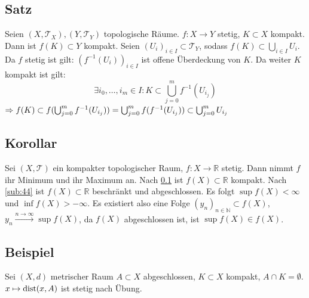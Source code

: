 \subsection[Satz: Das Bild einer kompakten Teilmenge ist kompakt]{Satz} %
\label{sub:49}
Seien $(X,\mathcal{T}_X), (Y, \mathcal{T}_Y)$ topologische Räume. $f : X \to Y$ stetig, $K \subset X$ kompakt. Dann ist $f(K) \subset Y$ kompakt.
Seien $(U_i)_{i \in I} \subset \mathcal{T}_Y$, sodass $f(K) \subset \bigcup_{i \in I} U_{i}$. Da $f$ stetig ist gilt: $(f ^{-1} (U_i))_{i \in I}$ ist offene Überdeckung 
von $K$. Da weiter $K$ kompakt ist gilt:
\[
	\exists i_0, \ldots , i_m \in I : K \subset \bigcup_{j=0}^m f ^{-1} ( U_{i_j})
\]
$\Rightarrow f(K) \subset f (\bigcup_{j=0}^m f ^{-1} ( U_{i_j}))  = \bigcup_{j=0}^m f ( f ^{-1} (U_{i_j}))  \subset \bigcup_{j=0}^m U_{i_j}$ \bewende

\subsection[Korollar: Auf kompakten topl. Räumen nimmt stetiges $f$ Minimum und Maximum an]{Korollar} %
\label{sub:410}
Sei $(X, \mathcal{T})$ ein kompakter topologischer Raum, $f : X \to \mathds{R}$ stetig. Dann nimmt $f$ ihr Minimum und ihr Maximum an.
Nach \ref{sub:49} ist $f(X) \subset \mathds{R}$ kompakt. Nach \ref{sub:44} ist $f(X) \subset \mathds{R}$ beschränkt und abgeschlossen. Es folgt $\sup f(X) < \infty$
und $\inf f(X) > - \infty$. Es existiert also eine Folge $(y_n)_{n \in \mathds{N}} \subset f(X)$, $y_n \xrightarrow{n \to \infty} \sup f(X)$, da $f(X)$ abgeschlossen ist,
ist $\sup f(X) \in f(X)$.

\subsection[Beispiel mit $\dist$]{Beispiel} %
\label{sub:411}
Sei $(X,d)$ metrischer Raum $A \subset X$ abgeschlossen, $K \subset X$ kompakt, $A \cap K = \emptyset$. $x \mapsto \operatorname{dist} (x,A)$ ist stetig nach Übung.

